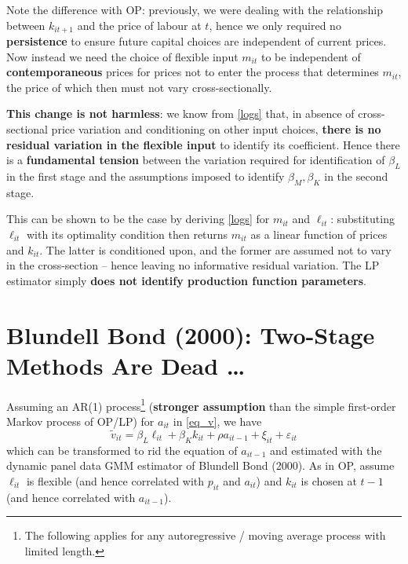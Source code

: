 \documentclass[11pt]{article}
\begin{document}
Note the difference with OP: previously, we were dealing with the relationship between $k_{it+1}$ and the price of labour at $t$, hence we only required no \textbf{persistence} to ensure future capital choices are independent of current prices.
Now instead we need the choice of flexible input $m_{it}$ to be independent of \textbf{contemporaneous} prices for prices not to enter the process that determines $m_{it}$, the price of which then must not vary cross-sectionally.

\textbf{This change is not harmless}: we know from \eqref{logs} that, in absence of cross-sectional price variation and conditioning on other input choices, \textbf{there is no residual variation in the flexible input} to identify its coefficient.
Hence there is a \textbf{fundamental tension} between the variation required for identification of $\beta_L$ in the first stage and the assumptions imposed to identify $\beta_M, \beta_K$ in the second stage.

This can be shown to be the case by deriving \eqref{logs} for $m_{it}$ and $\ell_{it}$: substituting $\ell_{it}$ with its optimality condition then returns $m_{it}$ as a linear function of prices and $k_{it}$.
The latter is conditioned upon, and the former are assumed not to vary in the cross-section -- hence leaving no informative residual variation.
The LP estimator simply \textbf{does not identify production function parameters}.

\section{Blundell Bond (2000): Two-Stage Methods Are Dead \dots}

Assuming an AR(1) process\footnote{The following applies for any autoregressive / moving average process with limited length.} (\textbf{stronger assumption} than the simple first-order Markov process of OP/LP) for $a_{it}$ in \eqref{eq_v}, we have
\begin{equation}
	\label{eq_v_bb}
	\tilde{v}_{it} = \beta_L \ell_{it} + \beta_K k_{it} + \rho a_{it-1} + \xi_{it} + \varepsilon_{it}
\end{equation}
which can be transformed to rid the equation of $a_{it-1}$ and estimated with the dynamic panel data GMM estimator of Blundell Bond (2000).
As in OP, assume $\ell_{it}$ is flexible (and hence correlated with $p_{it}$ and $a_{it}$) and $k_{it}$ is chosen at $t-1$ (and hence correlated with $a_{it-1}$).
\end{document}

